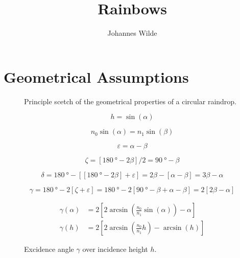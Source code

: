 \documentclass[pagesize=pdftex,paper=a4,fontsize=12pt]{scrartcl}
\title{Rainbows}
\author{Johannes Wilde}
\begin{document}
\maketitle

\section{Geometrical Assumptions}



\begin{figure}[H]
	\centering
	
	\caption{Principle scetch of the geometrical properties of a circular raindrop.}
	\label{fig:PrincipleScetch}
\end{figure}


\[ h = \sin(\alpha) \]

\[ n_0 \sin(\alpha) = n_1 \sin(\beta) \]

\[ \varepsilon = \alpha - \beta \]

\[ \zeta = [\SI{180}{\degree} - 2 \beta] / 2 = \SI{90}{\degree} - \beta \]

\[ \delta = \SI{180}{\degree} - [[\SI{180}{\degree} - 2 \beta] + \varepsilon] = 2 \beta - [\alpha - \beta] = 3 \beta - \alpha \]

\[ \gamma = \SI{180}{\degree} - 2 [\zeta + \varepsilon] = \SI{180}{\degree} - 2 [\SI{90}{\degree} - \beta + \alpha - \beta] = 2 [2 \beta - \alpha] \]

\begin{align}
	\gamma (\alpha) & = 2 \left[2 \arcsin\left(\frac{n_0}{n_1} \sin(\alpha)\right) - \alpha\right] \nonumber \\[.5em]
	\gamma (h) & = 2 \left[2 \arcsin\left(\frac{n_0}{n_1} h\right) - \arcsin(h)\right]
\end{align}

\begin{figure}[H]
	\centering
	\caption{Excidence angle $\gamma$ over incidence height $h$.}
	\label{fig:GammaOverH}
\end{figure}
\end{document}
